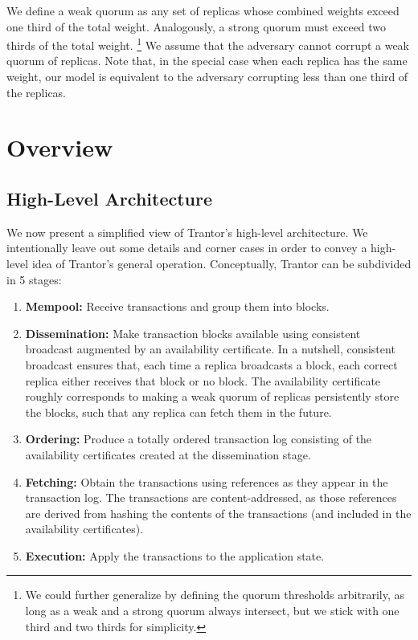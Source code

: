 \documentclass{article}
\begin{document}
We define a weak quorum as any set of replicas whose combined weights exceed one third of the total weight.
Analogously, a strong quorum must exceed two thirds of the total weight.%
\footnote{We could further generalize by defining the quorum thresholds arbitrarily,
as long as a weak and a strong quorum always intersect, but we stick with one third and two thirds for simplicity.}
We assume that the adversary cannot corrupt a weak quorum of replicas.
Note that, in the special case when each replica has the same weight,
our model is equivalent to the adversary corrupting less than one third of the replicas.

\section{Overview}
\label{sec:overview}

\subsection{High-Level Architecture}

We now present a simplified view of Trantor’s high-level architecture.
We intentionally leave out some details and corner cases in order to convey a high-level idea of Trantor’s general operation.
Conceptually, Trantor can be subdivided in 5 stages:

\begin{enumerate}

    \item \textbf{Mempool:} Receive transactions and group them into blocks.

    \item \textbf{Dissemination:} Make transaction blocks available using consistent broadcast \cite{distributedprogrammingbook} augmented by an availability certificate.
    In a nutshell, consistent broadcast ensures that, each time a replica broadcasts a block, each correct replica either receives that block or no block.
    The availability certificate roughly corresponds to making a weak quorum of replicas persistently store the blocks, such that any replica can fetch them in the future.

    \item \textbf{Ordering:} Produce a totally ordered transaction log consisting of the availability certificates created at the dissemination stage.

    \item \textbf{Fetching:} Obtain the transactions using references as they appear in the transaction log.
    The transactions are content-addressed, as those references are derived from hashing the contents of the transactions (and included in the availability certificates).

    \item \textbf{Execution:} Apply the transactions to the application state.

\end{enumerate}
\end{document}
